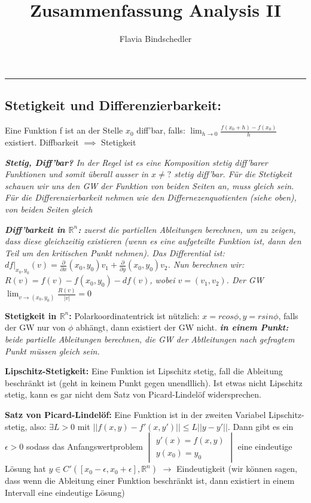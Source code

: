 \documentclass[a3paper, ngerman, 8pt]{article}
\title{Zusammenfassung Analysis II}
\author{Flavia Bindschedler}
\begin{document}
\makeatletter
{\Large \textbf{\@title}}
\hfill
{\@author}
\makeatother
\hrule

\begin{multicols*}{3}

\subsection*{Stetigkeit und Differenzierbarkeit:} Eine Funktion f ist an der Stelle $x_0$ diff'bar, falls: $ \lim_{h \to 0} \frac{f(x_0+h)-f(x_0)}{h}$ existiert. Diffbarkeit $\implies$ Stetigkeit

\textit{\textbf{Stetig, Diff'bar?} In der Regel ist es eine Komposition stetig diff'barer Funktionen und somit überall ausser in $x\neq ?$ stetig diff'bar. Für die Stetigkeit schauen wir uns den GW der Funktion von beiden Seiten an, muss gleich sein. Für die Differenzierbarkeit nehmen wie den Differnezenquotienten (siehe oben), von beiden Seiten gleich}

\textit{\textbf{Diff'barkeit in $\mathbb{R}^n$:} zuerst die partiellen Ableitungen berechnen, um zu zeigen, dass diese gleichzeitig existieren (wenn es eine aufgeteilte Funktion ist, dann den Teil um den kritischen Punkt nehmen). Das Differential ist: $df \vert _{{x_0, y_0}} (v) = \frac{\partial }{\partial x} (x_0, y_0)v_1 + \frac{\partial }{\partial y}(x_0, y_0)v_2$. Nun berechnen wir: $R(v)=f(v) - f(x_0, y_0) - df(v)$, wobei $v=(v_1, v_2)$. Der GW  $\lim_{v \to (x_0, y_0)} \frac{R(v)}{\vert v \vert} = 0$}

\textbf{Stetigkeit in $\mathbb{R}^n$:} Polarkoordinatentrick ist nützlich: $x= rcos\phi, y=rsin\phi$, falls der GW nur von $\phi$ abhängt, dann existiert der GW nicht. \textit{\textbf{in einem Punkt:} beide partielle Ableitungen berechnen, die GW der Abtleitungen nach gefragtem Punkt müssen gleich sein.}

\textbf{Lipschitz-Stetigkeit:} Eine Funktion ist Lipschitz stetig, fall die Ableitung beschränkt ist (geht in keinem Punkt gegen unendllich). Ist etwas nicht Lipschitz stetig, kann es gar nicht dem Satz von Picard-Lindelöf widersprechen. 


\textbf{Satz von Picard-Lindelöf:} Eine Funktion ist in der zweiten Variabel Lipschitz-stetig, also: $\exists L > 0$ mit $\vert \vert f(x,y)-f'(x,y')\vert \vert \leq L\vert \vert y-y'\vert \vert$. Dann gibt es ein $\epsilon > 0$ sodass das Anfangswertproblem 
$\begin{vmatrix}
	y'(x)=f(x,y)\\
	y(x_0)=y_0
\end{vmatrix}$ eine eindeutige Lösung hat $y\in C'([x_0-\epsilon, x_0+\epsilon], \mathbb{R}^n)$ $\to $ Eindeutigkeit (wir können sagen, dass wenn die Ableitung einer Funktion beschränkt ist, dann existiert in einem Intervall eine eindeutige Lösung)


\end{multicols*}
\end{document}
